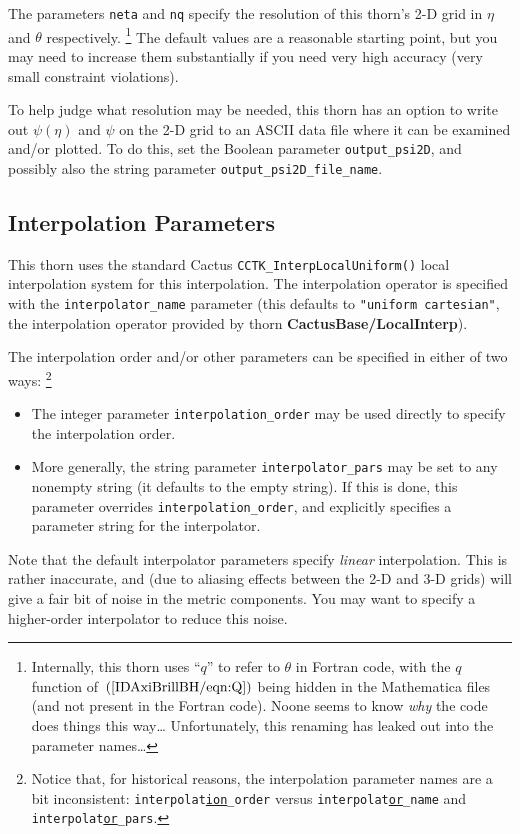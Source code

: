 \documentclass{article}
\begin{document}
The parameters \verb|neta| and \verb|nq| specify the resolution of
this thorn's 2-D grid in $\eta$ and $\theta$ respectively.%
\footnote{%
	 Internally, this thorn uses ``$q$'' to refer
	 to $\theta$ in Fortran code, with the $q$ function
	 of~$(\protect\ref{IDAxiBrillBH/eqn:Q})$ being hidden
	 in the Mathematica files (and not present in the Fortran
	 code).  Noone seems to know \emph{why} the code does
	 things this way\dots{}  Unfortunately, this renaming
	 has leaked out into the parameter names\dots
	 }%
{}  The default values are a reasonable starting point, but you may
need to increase them substantially if you need very high accuracy
(very small constraint violations).

To help judge what resolution may be needed, this thorn has an option
to write out $\psi(\eta)$ and $\psi$ on the 2-D grid to an ASCII data file
where it can be examined and/or plotted.  To do this, set the Boolean
parameter \verb|output_psi2D|, and possibly also the string parameter
\verb|output_psi2D_file_name|.


\subsection{Interpolation Parameters}

This thorn uses the standard Cactus \verb|CCTK_InterpLocalUniform()|
local interpolation system for this interpolation.  The interpolation
operator is specified with the \verb|interpolator_name| parameter
(this defaults to \verb|"uniform cartesian"|, the interpolation
operator provided by thorn \textbf{CactusBase/LocalInterp}).

The interpolation order and/or other parameters can be specified
in either of two ways:%
\footnote{%
	 Notice that, for historical reasons, the
	 interpolation parameter names are a bit
	 inconsistent: \texttt{interpolat\underline{ion}\_order}
	 versus \texttt{interpolat\underline{or}\_name}
	 and \texttt{interpolat\underline{or}\_pars}.
	 }%
\begin{itemize}
\item	The integer parameter \verb|interpolation_order| may be
	used directly to specify the interpolation order.
\item	More generally, the string parameter \verb|interpolator_pars|
	may be set to any nonempty string (it defaults to the empty string).
	If this is done, this parameter overrides \verb|interpolation_order|,
	and explicitly specifies a parameter string for the interpolator.
\end{itemize}
Note that the default interpolator parameters specify \emph{linear}
interpolation.  This is rather inaccurate, and (due to aliasing effects
between the 2-D and 3-D grids) will give a fair bit of noise in the
metric components.  You may want to specify a higher-order interpolator
to reduce this noise.
\end{document}
